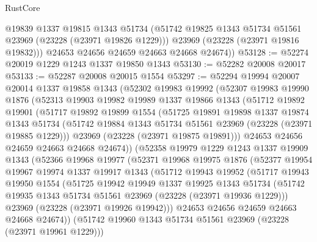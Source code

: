 \begin{lexlean}{RustCore}
\begin{coremodule}
          @19839
          @1337
          @19815
          @1343
          @51734
          (@51742 @19825 @1343 @51734 @51561 @23969 (@23228 (@23971 @19826 @1229)))
          @23969
          (@23228 (@23971 @19816 @19832)))
        @24653
        @24656
        @24659
        @24663
        @24668
        @24674))
@53128 := @52274 @20019 @1229 @1243 @1337 @19850 @1343
@53130 := @52282 @20008 @20017
@53133 := @52287 @20008 @20015 @1554
@53297 := @52294
    @19994
    @20007
    @20014
    @1337
    @19858
    @1343
    (@52302
      @19983
      @19992
      (@52307
        @19983
        @19990
        @1876
        (@52313
          @19903
          @19982
          @19989
          @1337
          @19866
          @1343
          (@51712
            @19892
            @19901
            (@51717
              @19892
              @19899
              @1554
              (@51725
                @19891
                @19898
                @1337
                @19874
                @1343
                @51734
                (@51742 @19884 @1343 @51734 @51561 @23969 (@23228 (@23971 @19885 @1229)))
                @23969
                (@23228 (@23971 @19875 @19891)))
              @24653
              @24656
              @24659
              @24663
              @24668
              @24674))
          (@52358
            @19979
            @1229
            @1243
            @1337
            @19909
            @1343
            (@52366
              @19968
              @19977
              (@52371
                @19968
                @19975
                @1876
                (@52377
                  @19954
                  @19967
                  @19974
                  @1337
                  @19917
                  @1343
                  (@51712
                    @19943
                    @19952
                    (@51717
                      @19943
                      @19950
                      @1554
                      (@51725
                        @19942
                        @19949
                        @1337
                        @19925
                        @1343
                        @51734
                        (@51742 @19935 @1343 @51734 @51561 @23969 (@23228 (@23971 @19936 @1229)))
                        @23969
                        (@23228 (@23971 @19926 @19942)))
                      @24653
                      @24656
                      @24659
                      @24663
                      @24668
                      @24674))
                  (@51742 @19960 @1343 @51734 @51561 @23969 (@23228 (@23971 @19961 @1229)))

\end{coremodule}
\end{lexlean}
